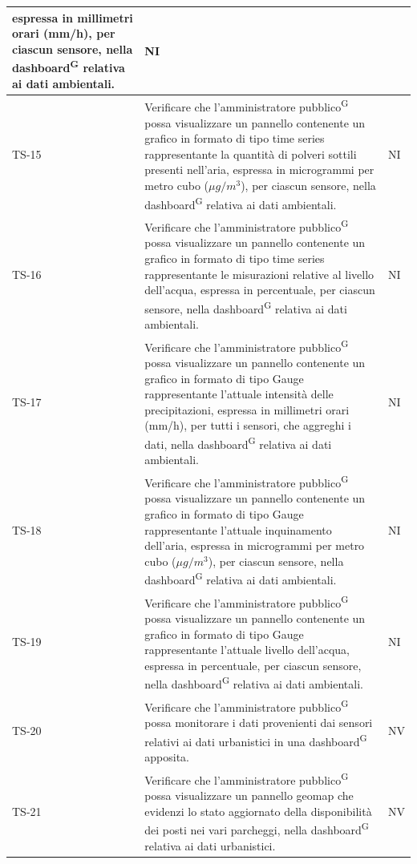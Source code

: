 \documentclass[8pt]{article}
\newcommand{\glossterm}[1]{#1\textsuperscript{G}} %
\begin{document}
\begin{longtable}{|>{\centering}p{2cm}|>{\RaggedRight}m{12cm}|>{\centering\arraybackslash}p{2cm}|}
    espressa in millimetri orari (mm/h), per ciascun sensore, nella \glossterm{dashboard} relativa ai dati ambientali.
    & NI \\
    \hline
    TS-15 & Verificare che l’\glossterm{amministratore pubblico} possa visualizzare un pannello contenente
    un grafico in formato di tipo time series rappresentante la quantità di polveri sottili presenti nell'aria,
    espressa in microgrammi per metro cubo ($\mu g / m^3$), per ciascun sensore, nella \glossterm{dashboard} relativa ai dati ambientali.
    & NI \\
    \hline
    TS-16 & Verificare che l’\glossterm{amministratore pubblico} possa visualizzare un pannello contenente
    un grafico in formato di tipo time series rappresentante le misurazioni relative al livello dell'acqua,
    espressa in percentuale, per ciascun sensore, nella \glossterm{dashboard} relativa ai dati ambientali.
    & NI \\
    \hline
    TS-17 & Verificare che l’\glossterm{amministratore pubblico} possa visualizzare un pannello contenente
    un grafico in formato di tipo Gauge rappresentante l'attuale intensità delle precipitazioni,
    espressa in millimetri orari (mm/h), per tutti i sensori, che aggreghi i dati, nella \glossterm{dashboard} relativa ai dati ambientali.
    & NI \\
    \hline
    TS-18 & Verificare che l’\glossterm{amministratore pubblico} possa visualizzare un pannello contenente
    un grafico in formato di tipo Gauge rappresentante l'attuale inquinamento dell'aria,
    espressa in microgrammi per metro cubo ($\mu g / m^3$), per ciascun sensore, nella \glossterm{dashboard} relativa ai dati ambientali.
    & NI \\
    \hline
    TS-19 & Verificare che l’\glossterm{amministratore pubblico} possa visualizzare un pannello contenente
    un grafico in formato di tipo Gauge rappresentante l'attuale livello dell'acqua,
    espressa in percentuale, per ciascun sensore, nella \glossterm{dashboard} relativa ai dati ambientali.
    & NI \\
    \hline
    TS-20 & Verificare che l’\glossterm{amministratore pubblico} possa monitorare i dati provenienti
    dai sensori relativi ai dati urbanistici in una \glossterm{dashboard} apposita.
    & NV \\
    \hline
    TS-21 & Verificare che l’\glossterm{amministratore pubblico} possa visualizzare un pannello geomap che evidenzi lo stato aggiornato della disponibilità dei posti nei vari parcheggi, nella
    \glossterm{dashboard} relativa ai dati urbanistici. & NV \\

\end{longtable}
\end{document}
